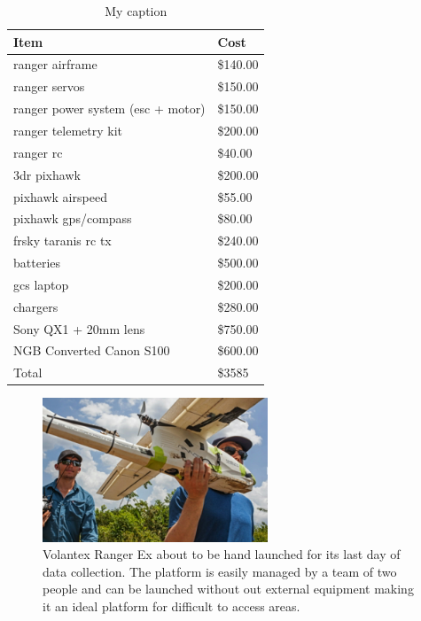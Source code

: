 \begin{table}[]
\centering
\caption{My caption}\label{table:FlightBOM}
\label{my-label}
\begin{tabular}{ll}
Item                                                    & Cost                          \\ \hline
ranger airframe                   & \$140.00 \\
ranger servos                     & \$150.00 \\
ranger power system (esc + motor) & \$150.00 \\
ranger telemetry kit              & \$200.00 \\
ranger rc                                               & \$40.00                       \\
3dr pixhawk                                             & \$200.00                      \\
pixhawk airspeed                                        & \$55.00                       \\
pixhawk gps/compass                                     & \$80.00                       \\
frsky taranis rc tx                                     & \$240.00                      \\
batteries                                               & \$500.00                      \\
gcs laptop                                              & \$200.00                      \\
chargers                                                & \$280.00                      \\
Sony QX1 + 20mm lens                                    & \$750.00                      \\
NGB Converted Canon S100                                & \$600.00                      \\ \hline
Total                                                   & \$3585
\end{tabular}
\end{table}

\begin{figure}[ht]
\includegraphics[width=0.6\textwidth]{Figures/Volantex.png}
\caption{Volantex Ranger Ex about to be hand launched for its last day of data collection. The platform is easily managed by a team of two people and can be launched without out external equipment making it an ideal platform for difficult to access areas.}
\label{fig:Volantex}
\end{figure}

